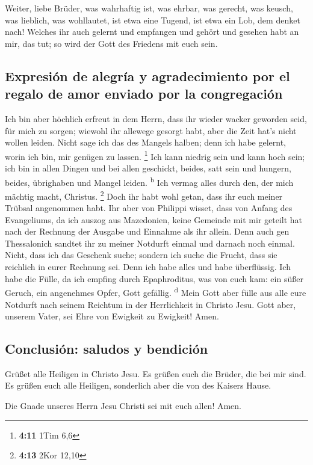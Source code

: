  Weiter, liebe Brüder, was wahrhaftig ist, was ehrbar, was
gerecht, was keusch, was lieblich, was wohllautet, ist etwa eine Tugend,
ist etwa ein Lob, dem denket nach!  Welches ihr auch
gelernt und empfangen und gehört und gesehen habt an mir, das tut; so
wird der Gott des Friedens mit euch sein.

\hypertarget{expresiuxf3n-de-alegruxeda-y-agradecimiento-por-el-regalo-de-amor-enviado-por-la-congregaciuxf3n}{%
\subsection{Expresión de alegría y agradecimiento por el regalo de amor
enviado por la
congregación}\label{expresiuxf3n-de-alegruxeda-y-agradecimiento-por-el-regalo-de-amor-enviado-por-la-congregaciuxf3n}}

 Ich bin aber höchlich erfreut in dem Herrn, dass ihr
wieder wacker geworden seid, für mich zu sorgen; wiewohl ihr allewege
gesorgt habt, aber die Zeit hat's nicht wollen leiden. 
Nicht sage ich das des Mangels halben; denn ich habe gelernt, worin ich
bin, mir genügen zu lassen. \footnote{\textbf{4:11} 1Tim 6,6}
 Ich kann niedrig sein und kann hoch sein; ich bin in
allen Dingen und bei allen geschickt, beides, satt sein und hungern,
beides, übrighaben und Mangel leiden. \textsuperscript{b}
 Ich vermag alles durch den, der mich mächtig macht,
Christus. \footnote{\textbf{4:13} 2Kor 12,10}  Doch ihr
habt wohl getan, dass ihr euch meiner Trübsal angenommen habt.
 Ihr aber von Philippi wisset, dass von Anfang des
Evangeliums, da ich auszog aus Mazedonien, keine Gemeinde mit mir
geteilt hat nach der Rechnung der Ausgabe und Einnahme als ihr allein.
 Denn auch gen Thessalonich sandtet ihr zu meiner
Notdurft einmal und darnach noch einmal.  Nicht, dass ich
das Geschenk suche; sondern ich suche die Frucht, dass sie reichlich in
eurer Rechnung sei.  Denn ich habe alles und habe
überflüssig. Ich habe die Fülle, da ich empfing durch Epaphroditus, was
von euch kam: ein süßer Geruch, ein angenehmes Opfer, Gott gefällig.
\textsuperscript{d}  Mein Gott aber fülle aus alle eure
Notdurft nach seinem Reichtum in der Herrlichkeit in Christo Jesu.
 Gott aber, unserem Vater, sei Ehre von Ewigkeit zu
Ewigkeit! Amen.

\hypertarget{conclusiuxf3n-saludos-y-bendiciuxf3n}{%
\subsection{Conclusión: saludos y
bendición}\label{conclusiuxf3n-saludos-y-bendiciuxf3n}}

 Grüßet alle Heiligen in Christo Jesu. Es grüßen euch die
Brüder, die bei mir sind.  Es grüßen euch alle Heiligen,
sonderlich aber die von des Kaisers Hause.

 Die Gnade unseres Herrn Jesu Christi sei mit euch allen!
Amen.
